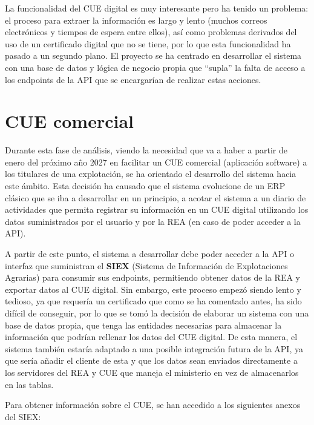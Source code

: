 \begin{itemize}
    La funcionalidad del CUE digital es muy interesante pero ha tenido un problema: el proceso para extraer la información 
    es largo y lento (muchos correos electrónicos y tiempos de espera entre ellos), así como problemas derivados del uso de 
    un certificado digital que no se tiene, por lo que esta funcionalidad ha pasado a un segundo plano. El proyecto se ha 
    centrado en desarrollar el sistema con una base de datos y lógica de negocio propia que ``supla'' la falta de acceso a los
    endpoints de la API que se encargarían de realizar estas acciones.
\end{itemize}

\section{CUE comercial}

Durante esta fase de análisis, viendo la necesidad que va a haber a partir de enero del próximo año 2027 en facilitar un CUE comercial 
(aplicación software) a los titulares de una explotación, se ha orientado el desarrollo del sistema hacia este ámbito. Esta 
decisión ha causado que el sistema evolucione de un ERP clásico que se iba a desarrollar en un principio, a acotar el sistema 
a un diario de actividades que permita registrar su información en un CUE digital utilizando los datos suministrados por el usuario
y por la REA (en caso de poder acceder a la API).

A partir de este punto, el sistema a desarrollar debe poder acceder a la API o interfaz que suministran el \textbf{SIEX} (Sistema de Información
de Explotaciones Agrarias) para consumir sus endpoints, permitiendo obtener datos de la REA y exportar datos al CUE digital. Sin embargo, este 
proceso empezó siendo lento y tedioso, ya que requería un certificado que como se ha comentado antes, ha sido difícil de conseguir, por lo que se 
tomó la decisión de elaborar un sistema con una base de datos propia, que tenga las entidades necesarias para almacenar la información que podrían 
rellenar los datos del CUE digital. De esta manera, el sistema también estaría adaptado a una posible integración futura de la API, ya que sería añadir
el cliente de esta y que los datos sean enviados directamente a los servidores del REA y CUE que maneja el ministerio en vez de almacenarlos en las tablas.

Para obtener información sobre el CUE, se han accedido a los siguientes anexos del SIEX:

